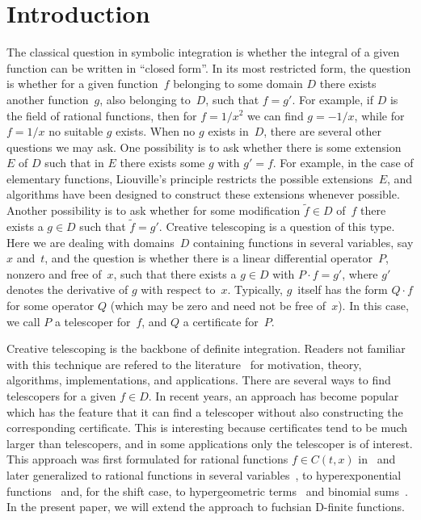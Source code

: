 \documentclass{sig-alternate}
\begin{document}

\section{Introduction}\label{SECT:intro}

The classical question in symbolic integration is whether the integral of
a given function can be written in ``closed form''. In its most restricted form,
the question is whether for a given function~$f$ belonging to some domain $D$
there exists another function~$g$, also belonging to~$D$, such that $f=g'$. For
example, if $D$ is the field of rational functions, then for $f=1/x^2$ we can
find $g=-1/x$, while for $f=1/x$ no suitable $g$ exists. When no $g$ exists
in~$D$, there are several other questions we may ask. One possibility is to ask
whether there is some extension~$E$ of $D$ such that in $E$ there exists some
$g$ with $g'=f$. For example, in the case of elementary functions, Liouville's
principle restricts the possible extensions~$E$, and algorithms have been
designed to construct these extensions whenever possible. Another possibility is
to ask whether for some modification $\tilde f\in D$ of~$f$ there exists a $g\in
D$ such that $\tilde f=g'$. Creative telescoping is a question of this
type. Here we are dealing with domains~$D$ containing functions in several
variables, say $x$ and~$t$, and the question is whether there is a linear
differential operator~$P$, nonzero and free of~$x$, such that there exists a
$g\in D$ with $P\cdot f=g'$, where $g'$ denotes the derivative of $g$ with
respect to~$x$. Typically, $g$~itself has the form $Q\cdot f$ for some operator
$Q$ (which may be zero and need not be free of~$x$). In this case, we call $P$
a telescoper for~$f$, and $Q$ a certificate for~$P$.

Creative telescoping is the backbone of definite integration. Readers not
familiar with this technique are refered to the literature~\cite{PWZbook1996,Zeilberger1990c,Zeilberger1991,Zeilberger1990,Koepf1998}
for motivation, theory, algorithms, implementations, and applications. There are
several ways to find telescopers for a given $f\in D$. In recent years, an
approach has become popular which has the feature that it can find a telescoper
without also constructing the corresponding certificate. This is interesting
because certificates tend to be much larger than telescopers, and in some
applications only the telescoper is of interest. This approach was first
formulated for rational functions $f\in C(t,x)$ in~\cite{BCCL2010} and later
generalized to rational functions in several variables~\cite{bostan13}, to
hyperexponential functions~\cite{bostan13a} and, for the shift case, to hypergeometric
terms~\cite{chen15a} and binomial sums~\cite{bostan15}. In the present paper, we will extend
the approach to fuchsian D-finite functions.
\end{document}
